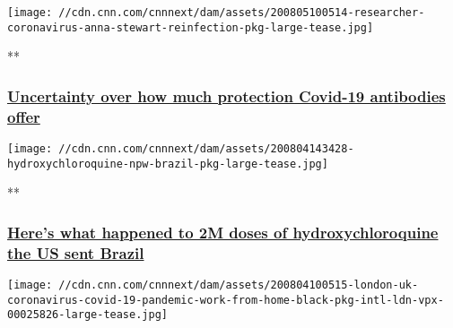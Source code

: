 \href{/videos/world/2020/08/05/coronavirus-covid-19-pandemic-testing-antibodies-stewart-pkg-nr-intl-lnd-vpx.cnn/video/playlists/coronavirus-intl/}{}

\texttt{[image: //cdn.cnn.com/cnnnext/dam/assets/200805100514-researcher-coronavirus-anna-stewart-reinfection-pkg-large-tease.jpg]}

**

\hypertarget{uncertainty-over-how-much-protection-covid-19-antibodies-offer}{%
\subsubsection{\texorpdfstring{\href{/videos/world/2020/08/05/coronavirus-covid-19-pandemic-testing-antibodies-stewart-pkg-nr-intl-lnd-vpx.cnn/video/playlists/coronavirus-intl/}{Uncertainty
over how much protection Covid-19 antibodies
offer}}{Uncertainty over how much protection Covid-19 antibodies offer}}\label{uncertainty-over-how-much-protection-covid-19-antibodies-offer}}

\href{/videos/world/2020/08/04/brazil-coronavirus-covid-19-pandemic-jair-bolsonaro-donald-trump-hydroxychloroquine-npw-intl-ldn-vpx.cnn/video/playlists/coronavirus-intl/}{}

\texttt{[image: //cdn.cnn.com/cnnnext/dam/assets/200804143428-hydroxychloroquine-npw-brazil-pkg-large-tease.jpg]}

**

\hypertarget{heres-what-happened-to-2m-doses-of-hydroxychloroquine-the-us-sent-brazil}{%
\subsubsection{\texorpdfstring{\href{/videos/world/2020/08/04/brazil-coronavirus-covid-19-pandemic-jair-bolsonaro-donald-trump-hydroxychloroquine-npw-intl-ldn-vpx.cnn/video/playlists/coronavirus-intl/}{Here's
what happened to 2M doses of hydroxychloroquine the US sent
Brazil}}{Here's what happened to 2M doses of hydroxychloroquine the US sent Brazil}}\label{heres-what-happened-to-2m-doses-of-hydroxychloroquine-the-us-sent-brazil}}

\href{/videos/world/2020/08/04/london-uk-coronavirus-covid-19-pandemic-work-from-home-black-pkg-intl-ldn-vpx.cnn/video/playlists/coronavirus-intl/}{}

\texttt{[image: //cdn.cnn.com/cnnnext/dam/assets/200804100515-london-uk-coronavirus-covid-19-pandemic-work-from-home-black-pkg-intl-ldn-vpx-00025826-large-tease.jpg]}

